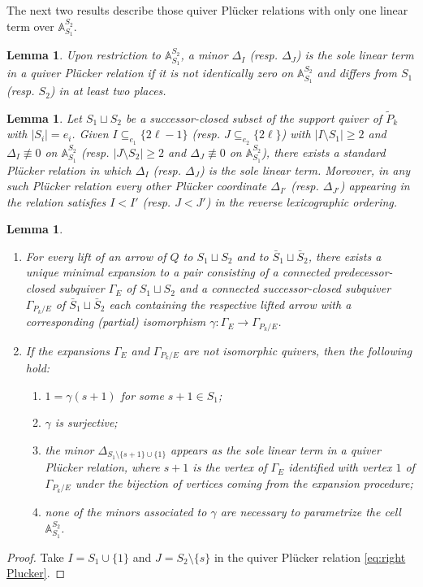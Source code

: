 \documentclass{amsart}
\newtheorem{lemma}[theorem]{Lemma}
\numberwithin{equation}{section}
\renewcommand{\AA}{\mathbb{A}}
\begin{document}
  The next two results describe those quiver Pl\"ucker relations with only one linear term over $\AA_{S_1}^{S_2}$.
  \begin{lemma}
    Upon restriction to $\AA_{S_1}^{S_2}$, a minor $\Delta_I$ (resp. $\Delta_J$) is the sole linear term in a quiver Pl\"ucker relation if it is not identically zero on $\AA_{S_1}^{S_2}$ and differs from $S_1$ (resp. $S_2$) in at least two places.
  \end{lemma}

  \begin{lemma}
    Let $S_1\sqcup S_2$ be a successor-closed subset of the support quiver of $\tilde P_k$ with $|S_i|=e_i$.
    Given $I \subseteq_{e_1} \{2\ell-1\}$ (resp. $J \subseteq_{e_2} \{2\ell\}$) with $|I\setminus S_1|\ge2$ and $\Delta_I\not\equiv 0$ on $\AA_{S_1}^{S_2}$ (resp. $|J\setminus S_2|\ge 2$ and $\Delta_J\not\equiv 0$ on $\AA_{S_1}^{S_2}$), there exists a standard Pl\"ucker relation in which $\Delta_I$ (resp. $\Delta_J$) is the sole linear term.
    Moreover, in any such Pl\"ucker relation every other Pl\"ucker coordinate $\Delta_{I'}$ (resp. $\Delta_{J'}$) appearing in the relation satisfies $I<I'$ (resp. $J<J'$) in the reverse lexicographic ordering.
  \end{lemma}
  \begin{lemma}
    \mbox{}
    \begin{enumerate}
      \item For every lift of an arrow of $Q$ to $S_1\sqcup S_2$ and to $\bar{S}_1\sqcup \bar{S}_2$, there exists a unique minimal expansion to a pair consisting of a connected predecessor-closed subquiver $\Gamma_E$ of $S_1\sqcup S_2$ and a connected successor-closed subquiver $\Gamma_{P_k/E}$ of $\bar{S}_1\sqcup \bar{S}_2$ each containing the respective lifted arrow with a corresponding (partial) isomorphism $\gamma:\Gamma_E\to\Gamma_{P_k/E}$.
      \item If the expansions $\Gamma_E$ and $\Gamma_{P_k/E}$ are not isomorphic quivers, then the following hold:
        \begin{enumerate}
          \item $1=\gamma(s+1)$ for some $s+1\in S_1$;
          \item $\gamma$ is surjective;
          \item the minor $\Delta_{S_1\setminus\{s+1\}\cup\{1\}}$ appears as the sole linear term in a quiver Pl\"ucker relation, where $s+1$ is the vertex of $\Gamma_E$ identified with vertex $1$ of $\Gamma_{P_k/E}$ under the bijection of vertices coming from the expansion procedure;
          \item none of the minors associated to $\gamma$ are necessary to parametrize the cell $\AA_{S_1}^{S_2}$.
        \end{enumerate}
    \end{enumerate}
  \end{lemma}
  \begin{proof}
    Take $I=S_1\cup\{1\}$ and $J=S_2\setminus\{s\}$ in the quiver Pl\"ucker relation \eqref{eq:right Plucker}.
  \end{proof}
\end{document}

